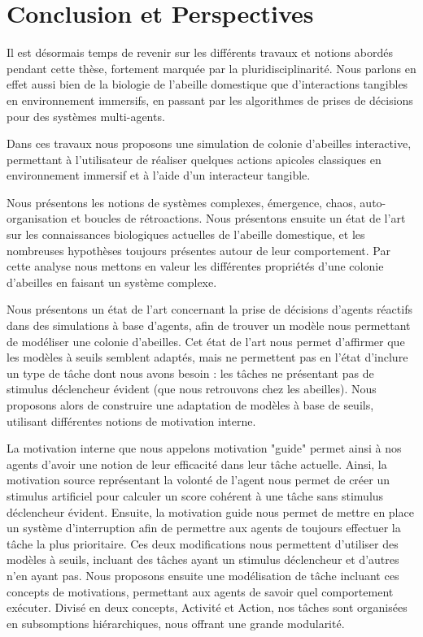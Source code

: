 \chapter*{Conclusion et Perspectives}

Il est désormais temps de revenir sur les différents travaux et notions abordés pendant cette thèse, fortement marquée par la pluridisciplinarité. Nous parlons en effet aussi bien de la biologie de l'abeille domestique que d'interactions tangibles en environnement immersifs, en passant par les algorithmes de prises de décisions pour des systèmes multi-agents.

Dans ces travaux nous proposons une simulation de colonie d'abeilles interactive, permettant à l'utilisateur de réaliser quelques actions apicoles classiques en environnement immersif et à l'aide d'un interacteur tangible.

Nous présentons les notions de systèmes complexes, émergence, chaos, auto-organisation et boucles de rétroactions. Nous présentons ensuite un état de l'art sur les connaissances biologiques actuelles de l'abeille domestique, et les nombreuses hypothèses toujours présentes autour de leur comportement. Par cette analyse nous mettons en valeur les différentes propriétés d'une colonie d'abeilles en faisant un système complexe.

Nous présentons un état de l'art concernant la prise de décisions d'agents réactifs dans des simulations à base d'agents, afin de trouver un modèle nous permettant de modéliser une colonie d'abeilles. Cet état de l'art nous permet d'affirmer que les modèles à seuils semblent adaptés, mais ne permettent pas en l'état d'inclure un type de tâche dont nous avons besoin : les tâches ne présentant pas de stimulus déclencheur évident (que nous retrouvons chez les abeilles). Nous proposons alors de construire une adaptation de modèles à base de seuils, utilisant différentes notions de motivation interne.

La motivation interne que nous appelons motivation "guide" permet ainsi à nos agents d'avoir une notion de leur efficacité dans leur tâche actuelle. Ainsi, la motivation source représentant la volonté de l'agent nous permet de créer un stimulus artificiel pour calculer un score cohérent à une tâche sans stimulus déclencheur évident. Ensuite, la motivation guide nous permet de mettre en place un système d'interruption afin de permettre aux agents de toujours effectuer la tâche la plus prioritaire. Ces deux modifications nous permettent d'utiliser des modèles à seuils, incluant des tâches ayant un stimulus déclencheur et d'autres n'en ayant pas. Nous proposons ensuite une modélisation de tâche incluant ces concepts de motivations, permettant aux agents de savoir quel comportement exécuter. Divisé en deux concepts, Activité et Action, nos tâches sont organisées en subsomptions hiérarchiques, nous offrant une grande modularité.

